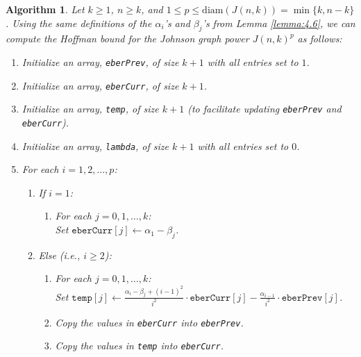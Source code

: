 \documentclass{article}
\numberwithin{equation}{section}
\theoremstyle{plain}
\newtheorem{algo}[theorem]{Algorithm}
\begin{document}
\begin{algo}\label{algo:4.7}
    Let $k \ge 1$, $n \ge k$, and $1 \le p \le \mathrm{diam}(J(n, k)) = \min\{k, n - k\}$. Using the same definitions of the $\alpha_i$'s and $\beta_j$'s from Lemma \ref{lemma:4.6}, we can compute the Hoffman bound for the Johnson graph power $J(n, k)^p$ as follows:
    {
        \normalfont
        \begin{enumerate}
            \item Initialize an array, \texttt{eberPrev}, of size $k + 1$ with all entries set to $1$.
            \item Initialize an array, \texttt{eberCurr}, of size $k + 1$.
            \item Initialize an array, \texttt{temp}, of size $k + 1$ (to facilitate updating \texttt{eberPrev} and \texttt{eberCurr}).
            \item Initialize an array, \texttt{lambda}, of size $k + 1$ with all entries set to $0$.
            \item For each $i = 1, 2, \ldots, p$:
                \begin{enumerate}
                    \item If $i = 1$:
                        \begin{enumerate}
                            \item For each $j = 0, 1, \ldots, k$:\\
                                \hspace*{\algorithmicindent}Set $\texttt{eberCurr}[j] \gets \alpha_1 - \beta_j$.
                        \end{enumerate}
                    \item Else (i.e., $i \ge 2$):
                        \begin{enumerate}
                            \item For each $j = 0, 1, \ldots, k$:\\
                                \hspace*{\algorithmicindent}Set $\texttt{temp}[j] \gets \frac{\alpha_i - \beta_j + (i - 1)^2}{i^2} \cdot \texttt{eberCurr}[j] - \frac{\alpha_{i - 1}}{i^2} \cdot \texttt{eberPrev}[j]$.
                            \item Copy the values in \texttt{eberCurr} into \texttt{eberPrev}.
                            \item Copy the values in \texttt{temp} into \texttt{eberCurr}.
                        \end{enumerate}

\end{enumerate}
\end{enumerate}}
\end{algo}
\end{document}
